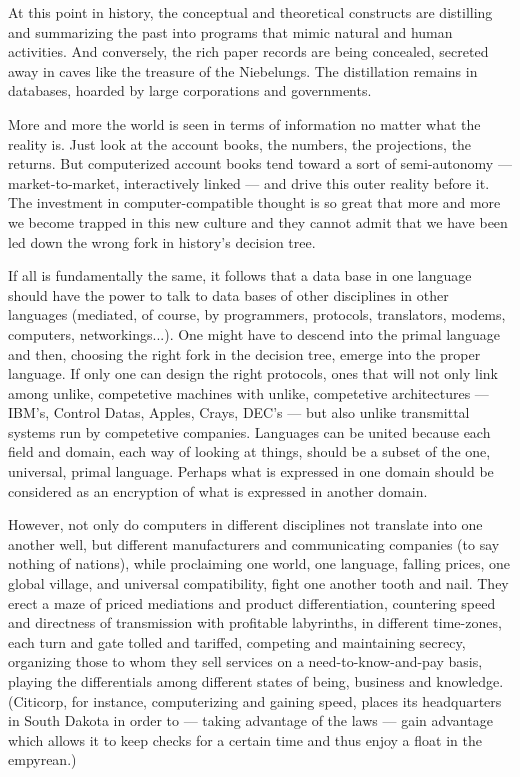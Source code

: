 \documentclass[11pt,twoside,draft]{memoir}
\begin{document}
At this point in history, the conceptual
and theoretical constructs are distilling and
summarizing the past into programs that
mimic natural and human activities. And
conversely, the rich paper records are being
concealed, secreted away in caves like the
treasure of the Niebelungs. The distillation
remains in databases,
hoarded by large corporations and governments.

More and more the world is seen in terms
of information no matter what the reality is.
Just look at the account books, the numbers,
the projections, the returns. But computerized account books tend toward a sort of
semi-autonomy --- market-to-market, interactively linked --- and drive this outer reality
before it. The investment in computer-compatible thought is so great that more and
more we become trapped in this new culture
and they cannot admit that we have been led
down the wrong fork in history's decision
tree.

If all is fundamentally the same, it follows
that a data base in one language should have
the power to talk to data bases of other
disciplines in other languages (mediated, of
course, by programmers, protocols, translators, modems, computers, networkings...).
One might have to descend into the primal
language and then, choosing the right fork in
the decision tree, emerge into the proper
language. If only one can design the right
protocols, ones that will not only link among
unlike, competetive machines with unlike,
competetive architectures --- IBM's,
Control Datas, Apples, Crays, DEC's --- but also unlike
transmittal systems run by competetive companies. Languages can be united because
each field and domain, each way of looking at things,
should be a subset of the one,
universal, primal language. Perhaps what is
expressed in one domain should be considered as an encryption of what is expressed
in another domain.

However, not only do computers in different disciplines not translate into one
another well, but different manufacturers
and communicating companies (to say nothing of nations), while proclaiming one world,
one language, falling prices, one global village, and universal compatibility, fight one
another tooth and nail. They erect a maze of priced mediations and product differentiation,
countering speed and directness of transmission with profitable labyrinths, in
different time-zones, each turn and gate
tolled and tariffed, competing and maintaining secrecy, organizing those to whom they
sell services on a need-to-know-and-pay
basis, playing the differentials among different states of being, business and knowledge. (Citicorp, for instance, computerizing
and gaining speed, places its headquarters in South Dakota in order to --- taking 
advantage of the laws --- gain advantage which allows it to keep checks for a certain time and
thus enjoy a float in the empyrean.)
\end{document}
